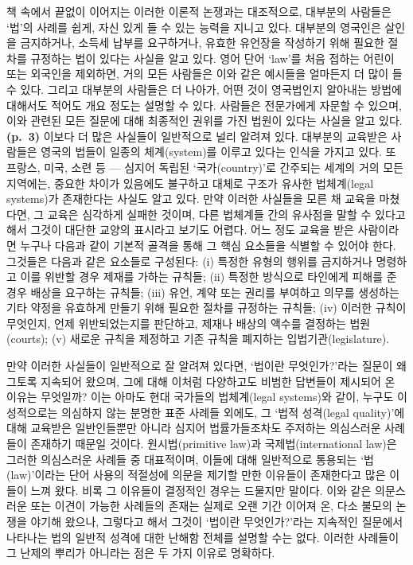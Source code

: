 \documentclass[12pt, oneside]{book}  %
\begin{document}
책 속에서 끝없이 이어지는 이러한 이론적 논쟁과는 대조적으로, 대부분의
사람들은 `법'의 사례를 쉽게, 자신 있게 들 수 있는 능력을 지니고 있다.
대부분의 영국인은 살인을 금지하거나, 소득세 납부를 요구하거나, 유효한
유언장을 작성하기 위해 필요한 절차를 규정하는 법이 있다는 사실을 알고
있다. 영어 단어 `law'를 처음 접하는 어린이 또는 외국인을 제외하면, 거의
모든 사람들은 이와 같은 예시들을 얼마든지 더 많이 들 수 있다. 그리고
대부분의 사람들은 더 나아가, 어떤 것이 영국법인지 알아내는 방법에
대해서도 적어도 개요 정도는 설명할 수 있다. 사람들은 전문가에게 자문할
수 있으며, 이와 관련된 모든 질문에 대해 최종적인 권위를 가진 법원이
있다는 사실을 알고 있다. \textbf{(p.~3)} 이보다 더 많은 사실들이
일반적으로 널리 알려져 있다. 대부분의 교육받은 사람들은 영국의 법들이
일종의 체계(system)를 이루고 있다는 인식을 가지고 있다. 또 프랑스, 미국,
소련 등 --- 심지어 독립된 `국가(country)'로 간주되는 세계의 거의 모든
지역에는, 중요한 차이가 있음에도 불구하고 대체로 구조가 유사한
법체계(legal systems)가 존재한다는 사실도 알고 있다. 만약 이러한
사실들을 모른 채 교육을 마쳤다면, 그 교육은 심각하게 실패한 것이며, 다른
법체계들 간의 유사점을 말할 수 있다고 해서 그것이 대단한 교양의 표시라고
보기도 어렵다. 어느 정도 교육을 받은 사람이라면 누구나 다음과 같이
기본적 골격을 통해 그 핵심 요소들을 식별할 수 있어야 한다. 그것들은
다음과 같은 요소들로 구성된다: (i) 특정한 유형의 행위를 금지하거나
명령하고 이를 위반할 경우 제재를 가하는 규칙들; (ii) 특정한 방식으로
타인에게 피해를 준 경우 배상을 요구하는 규칙들; (iii) 유언, 계약 또는
권리를 부여하고 의무를 생성하는 기타 약정을 유효하게 만들기 위해 필요한
절차를 규정하는 규칙들; (iv) 이러한 규칙이 무엇인지, 언제 위반되었는지를
판단하고, 제재나 배상의 액수를 결정하는 법원(courts); (v) 새로운 규칙을
제정하고 기존 규칙을 폐지하는 입법기관(legislature).

만약 이러한 사실들이 일반적으로 잘 알려져 있다면, `법이란 무엇인가?'라는
질문이 왜 그토록 지속되어 왔으며, 그에 대해 이처럼 다양하고도 비범한
답변들이 제시되어 온 이유는 무엇일까? 이는 아마도 현대 국가들의
법체계(legal systems)와 같이, 누구도 이성적으로는 의심하지 않는 분명한
표준 사례들 외에도, 그 `법적 성격(legal quality)'에 대해 교육받은
일반인들뿐만 아니라 심지어 법률가들조차도 주저하는 의심스러운 사례들이
존재하기 때문일 것이다. 원시법(primitive law)과 국제법(international
law)은 그러한 의심스러운 사례들 중 대표적이며, 이들에 대해 일반적으로
통용되는 `법(law)'이라는 단어 사용의 적절성에 의문을 제기할 만한
이유들이 존재한다고 많은 이들이 느껴 왔다. 비록 그 이유들이 결정적인
경우는 드물지만 말이다. 이와 같은 의문스러운 또는 이견이 가능한 사례들의
존재는 실제로 오랜 기간 이어져 온, 다소 불모의 논쟁을 야기해 왔으나,
그렇다고 해서 그것이 `법이란 무엇인가?'라는 지속적인 질문에서 나타나는
법의 일반적 성격에 대한 난해함 전체를 설명할 수는 없다. 이러한 사례들이
그 난제의 뿌리가 아니라는 점은 두 가지 이유로 명확하다.
\end{document}

